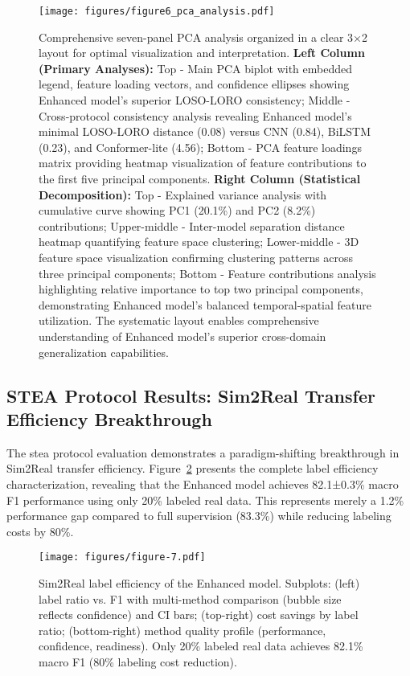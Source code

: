 \documentclass[journal]{IEEEtran}
\begin{document}
\begin{figure}[ht]
\centering
\texttt{[image: figures/figure6\_pca\_analysis.pdf]}
\caption{Comprehensive seven-panel PCA analysis organized in a clear 3×2 layout for optimal visualization and interpretation. \textbf{Left Column (Primary Analyses):} Top - Main PCA biplot with embedded legend, feature loading vectors, and confidence ellipses showing Enhanced model's superior LOSO-LORO consistency; Middle - Cross-protocol consistency analysis revealing Enhanced model's minimal LOSO-LORO distance (0.08) versus CNN (0.84), BiLSTM (0.23), and Conformer-lite (4.56); Bottom - PCA feature loadings matrix providing heatmap visualization of feature contributions to the first five principal components. \textbf{Right Column (Statistical Decomposition):} Top - Explained variance analysis with cumulative curve showing PC1 (20.1\%) and PC2 (8.2\%) contributions; Upper-middle - Inter-model separation distance heatmap quantifying feature space clustering; Lower-middle - 3D feature space visualization confirming clustering patterns across three principal components; Bottom - Feature contributions analysis highlighting relative importance to top two principal components, demonstrating Enhanced model's balanced temporal-spatial feature utilization. The systematic layout enables comprehensive understanding of Enhanced model's superior cross-domain generalization capabilities.}
\label{fig:pca_analysis}
\end{figure}

\subsection{STEA Protocol Results: Sim2Real Transfer Efficiency Breakthrough}

The \gls{stea} protocol evaluation demonstrates a paradigm-shifting breakthrough in Sim2Real transfer efficiency. Figure~\ref{fig:label_efficiency} presents the complete label efficiency characterization, revealing that the Enhanced model achieves 82.1±0.3\% macro F1 performance using only 20\% labeled real data. This represents merely a 1.2\% performance gap compared to full supervision (83.3\%) while reducing labeling costs by 80\%.

\begin{figure}[ht]
\centering
\texttt{[image: figures/figure-7.pdf]}%
\caption{Sim2Real label efficiency of the Enhanced model. Subplots: (left) label ratio vs. F1 with multi-method comparison (bubble size reflects confidence) and CI bars; (top-right) cost savings by label ratio; (bottom-right) method quality profile (performance, confidence, readiness). Only 20\% labeled real data achieves 82.1\% macro F1 (80\% labeling cost reduction).}
\label{fig:label_efficiency}
\end{figure}
\end{document}
